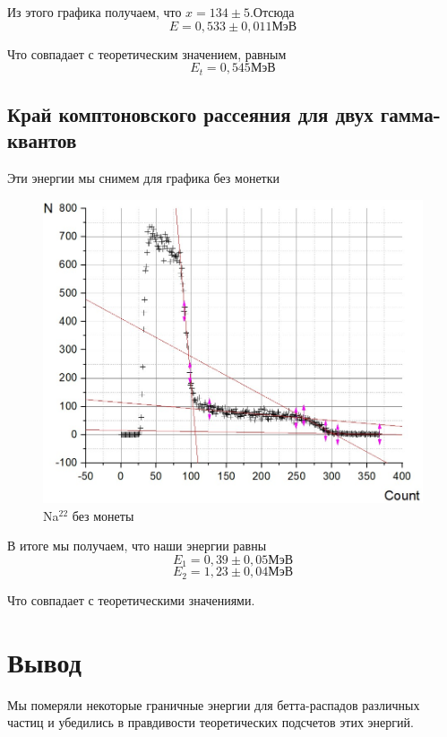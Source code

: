 \documentclass[a4paper, 12pt]{article}%
\begin{document}
Из этого графика получаем, что $x = 134\pm 5$.Отсюда
\[E = 0,533 \pm 0,011 \text{МэВ}\]

Что совпадает с теоретическим значением, равным
\[E_t = 0,545 \text{МэВ}\]

\newpage

\subsection*{Край комптоновского рассеяния для двух гамма-квантов}

Эти энергии мы снимем для графика без монетки

\begin{figure}[h]
\begin{center}
\includegraphics[width = \textwidth]{16.jpg}
\caption{Na$^{22}$ без монеты}
\end{center}
\end{figure}

В итоге мы получаем, что наши энергии равны
\[E_1 = 0,39 \pm 0,05 \text{МэВ}\]
\[E_2 = 1,23 \pm 0,04 \text{МэВ}\]

Что совпадает с теоретическими значениями.

\section*{Вывод}
Мы померяли некоторые граничные энергии для бетта-распадов различных частиц и убедились в правдивости теоретических подсчетов этих энергий.
\end{document}
